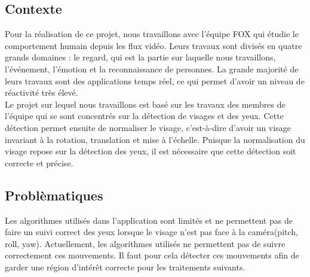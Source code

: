 


\subsection{Contexte}
Pour la réalisation de ce projet, nous travaillons avec l'équipe FOX qui étudie
le comportement humain depuis les flux vidéo. Leurs travaux sont
divisés en quatre grands domaines : le regard, qui est la partie sur laquelle nous travaillons, l'événement, l'émotion et la
reconnaissance de personnes. La grande majorité de leurs travaux sont
des applications temps réel, ce qui permet d'avoir un niveau de réactivité très élevé.\\ 

Le projet sur lequel nous travaillons est basé sur les travaux des membres de l'équipe qui se sont concentrés sur la
détection de visages et des yeux. Cette détection permet ensuite de normaliser le visage, c'est-à-dire
d'avoir un visage invariant à la rotation, translation et mise à l'échelle.
Puisque la normalisation du visage repose sur la détection des yeux, il est nécessaire que cette 
détection soit correcte et précise. \\

\subsection{Problèmatiques}
Les algorithmes utilisés dans l'application sont limités et ne permettent pas de faire un suivi correct des yeux 
lorsque le visage n'est pas face à la caméra(pitch, roll, yaw). Actuellement, les algorithmes utilisés ne permettent pas
de suivre correctement ces mouvements. Il faut pour cela détecter
ces mouvements afin de garder une région d'intérêt correcte pour les traitements suivants.\\

